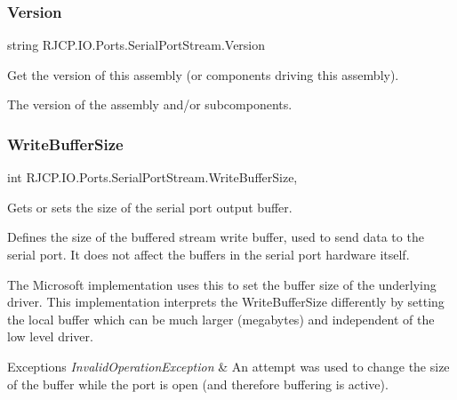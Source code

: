 \subsubsection{\texorpdfstring{Version}{Version}}
{\footnotesize\ttfamily string R\+J\+C\+P.\+I\+O.\+Ports.\+Serial\+Port\+Stream.\+Version\hspace{0.3cm}{\ttfamily [get]}}



Get the version of this assembly (or components driving this assembly). 

The version of the assembly and/or subcomponents.\mbox{\label{class_r_j_c_p_1_1_i_o_1_1_ports_1_1_serial_port_stream_a5348dc0afb09c8118d9f440e4d090d3e}} 
\subsubsection{\texorpdfstring{WriteBufferSize}{WriteBufferSize}}
{\footnotesize\ttfamily int R\+J\+C\+P.\+I\+O.\+Ports.\+Serial\+Port\+Stream.\+Write\+Buffer\+Size\hspace{0.3cm}{\ttfamily [get]}, {\ttfamily [set]}}



Gets or sets the size of the serial port output buffer. 

Defines the size of the buffered stream write buffer, used to send data to the serial port. It does not affect the buffers in the serial port hardware itself. 

The Microsoft implementation uses this to set the buffer size of the underlying driver. This implementation interprets the Write\+Buffer\+Size differently by setting the local buffer which can be much larger (megabytes) and independent of the low level driver.


\begin{DoxyExceptions}{Exceptions}
{\em Invalid\+Operation\+Exception} & An attempt was used to change the size of the buffer while the port is open (and therefore buffering is active).\\
\hline
\end{DoxyExceptions}
\mbox{\label{class_r_j_c_p_1_1_i_o_1_1_ports_1_1_serial_port_stream_ac81624fba3a2bfe67ddd418786803b43}} 
